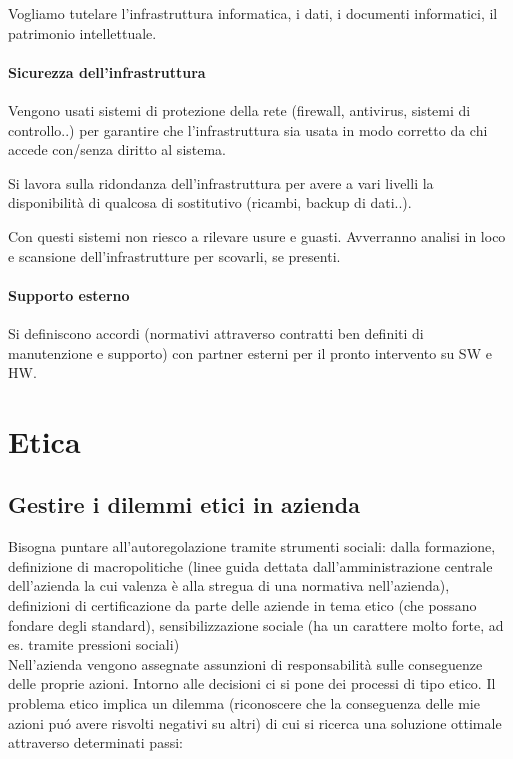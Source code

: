 Vogliamo tutelare l'infrastruttura informatica, i dati, i documenti
informatici, il patrimonio intellettuale.

\subsubsection{Sicurezza dell'infrastruttura}

Vengono usati sistemi di protezione della rete (firewall, antivirus,
sistemi di controllo..) per garantire che l'infrastruttura sia usata in
modo corretto da chi accede con/senza diritto al sistema.

Si lavora sulla ridondanza dell'infrastruttura per avere a vari livelli
la disponibilit\`a di qualcosa di sostitutivo (ricambi, backup di dati..).

Con questi sistemi non riesco a rilevare usure e guasti. Avverranno
analisi in loco e scansione dell'infrastrutture per scovarli, se
presenti.

\subsubsection{Supporto esterno}

Si definiscono accordi (normativi attraverso contratti ben definiti di
manutenzione e supporto) con partner esterni per il pronto intervento su
SW e HW.

\chapter{Etica}

\section{Gestire i dilemmi etici in azienda}
Bisogna puntare all'autoregolazione tramite strumenti sociali: dalla
formazione, definizione di macropolitiche (linee guida dettata
dall'amministrazione centrale dell'azienda la cui valenza \`e alla stregua
di una normativa nell'azienda), definizioni di certificazione da parte
delle aziende in tema etico (che possano fondare degli standard),
sensibilizzazione sociale (ha un carattere molto forte, ad es. tramite
pressioni sociali)\\
Nell'azienda vengono assegnate assunzioni di responsabilit\`a sulle
conseguenze delle proprie azioni. Intorno alle decisioni ci si pone dei
processi di tipo etico. Il problema etico implica un dilemma
(riconoscere che la conseguenza delle mie azioni pu\'o avere risvolti
negativi su altri) di cui si ricerca una soluzione ottimale attraverso
determinati passi:

